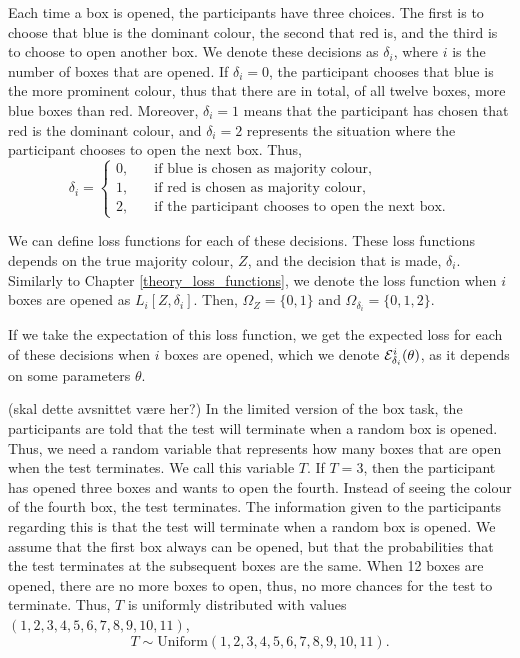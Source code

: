 Each time a box is opened, the participants have three choices. The first is to choose that blue is the dominant colour, the second that red is, and the third is to choose to open another box. We denote these decisions as $\delta_i$, where $i$ is the number of boxes that are opened. If $\delta_i = 0$, the participant chooses that blue is the more prominent colour, thus that there are in total, of all twelve boxes, more blue boxes than red. Moreover, $\delta_i=1$ means that the participant has chosen that red is the dominant colour, and $\delta_i=2$ represents the situation where the participant chooses to open the next box. Thus,
\begin{equation}
\label{def_of_delta}
    \delta_i =
    \begin{cases}
        0,& \quad \text{if blue is chosen as majority colour,}\\
        1,& \quad \text{if red is chosen as majority colour,}\\
        2,& \quad \text{if the participant chooses to open the next box.}
    \end{cases}
\end{equation}

We can define loss functions for each of these decisions. These loss functions depends on the true majority colour, $Z$, and the decision that is made, $\delta_i$. Similarly to Chapter \ref{theory_loss_functions}, we denote the loss function when $i$ boxes are opened as $L_i[Z,\delta_i]$. Then, $\Omega_Z = \{0,1\}$ and $\Omega_{\delta_i}=\{0,1,2\}$.


If we take the expectation of this loss function, we get the expected loss for each of these decisions when $i$ boxes are opened, which we denote $\mathcal{E}^i_{\delta_i}(\theta)$, as it depends on some parameters $\theta$. 

(skal dette avsnittet være her?)
In the limited version of the box task, the participants are told that the test will terminate when a random box is opened. Thus, we need a random variable that represents how many boxes that are open when the test terminates. We call this variable $T$. If $T=3$, then the participant has opened three boxes and wants to open the fourth. Instead of seeing the colour of the fourth box, the test terminates. The information given to the participants regarding this is that the test will terminate when a random box is opened. We assume that the first box always can be opened, but that the probabilities that the test terminates at the subsequent boxes are the same. When 12 boxes are opened, there are no more boxes to open, thus, no more chances for the test to terminate. Thus, $T$ is uniformly distributed with values $(1,2,3,4,5,6,7,8,9,10,11)$, 
\begin{equation}
\label{T_uniform}
    T \sim \text{Uniform}({1,2,3,4,5,6,7,8,9,10,11}).
\end{equation}

